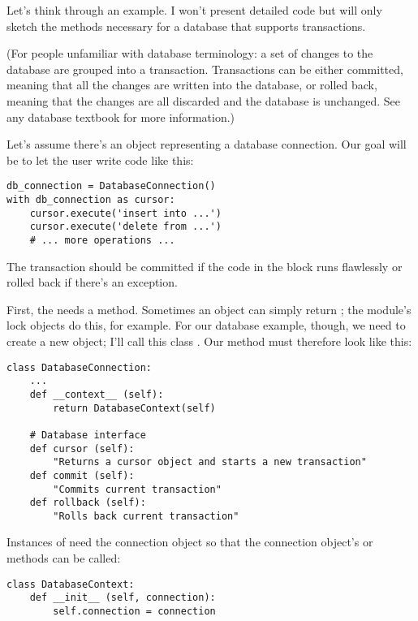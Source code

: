 \documentclass{howto}
\begin{document}
Let's think through an example.  I won't present detailed code but
will only sketch the methods necessary for a database that supports
transactions.

(For people unfamiliar with database terminology: a set of changes to
the database are grouped into a transaction.  Transactions can be
either committed, meaning that all the changes are written into the
database, or rolled back, meaning that the changes are all discarded
and the database is unchanged.  See any database textbook for more
information.)

Let's assume there's an object representing a database connection.
Our goal will be to let the user write code like this:

\begin{verbatim}
db_connection = DatabaseConnection()
with db_connection as cursor:
    cursor.execute('insert into ...')
    cursor.execute('delete from ...')
    # ... more operations ...
\end{verbatim}

The transaction should be committed if the code in the block
runs flawlessly or rolled back if there's an exception.

First, the  needs a 
method.  Sometimes an object can simply return ; the
 module's lock objects do this, for example.  For
our database example, though, we need to create a new object; I'll
call this class .  Our 
method must therefore look like this:

\begin{verbatim}
class DatabaseConnection:
    ...
    def __context__ (self):
        return DatabaseContext(self)

    # Database interface
    def cursor (self):
        "Returns a cursor object and starts a new transaction"
    def commit (self):
        "Commits current transaction"
    def rollback (self):
        "Rolls back current transaction"
\end{verbatim}

Instances of  need the connection object so that
the connection object's  or 
methods can be called:

\begin{verbatim}
class DatabaseContext:
    def __init__ (self, connection):
        self.connection = connection
\end{verbatim}
\end{document}
